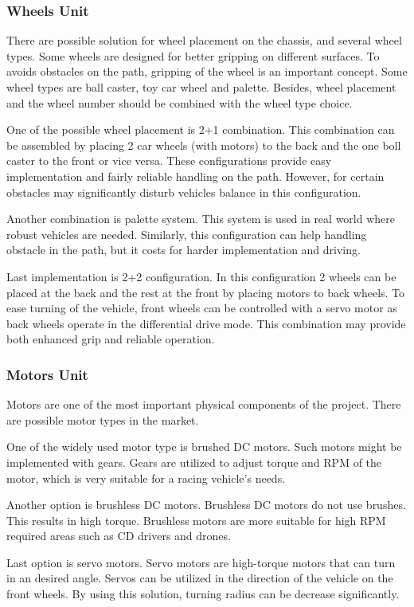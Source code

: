 \documentclass[a4paper,12pt]{article}
\begin{document}
\subsubsection{Wheels Unit}
There are possible solution for wheel placement on the chassis, and several wheel types. Some wheels are designed for better gripping on different surfaces. To avoids obstacles on the path, gripping of the wheel is an important concept. Some wheel types are ball caster, toy car wheel and palette. Besides, wheel placement and the wheel number should be combined with the wheel type choice. 

One of the possible wheel placement is 2+1 combination. This combination can be assembled by placing 2 car wheels (with motors) to the back and the one boll caster to the front or vice versa. These configurations provide easy implementation and fairly reliable handling on the path. However, for certain obstacles may significantly disturb vehicles balance in this configuration.

Another combination is palette system. This system is used in real world where robust vehicles are needed. Similarly, this configuration can help handling obstacle in the path, but it costs for harder implementation and driving.

Last implementation is 2+2 configuration. In this configuration 2 wheels can be placed at the back and the rest at the front by placing motors to back wheels. To ease turning of the vehicle, front wheels can be controlled with a servo motor as back wheels operate in the differential drive mode. This combination may provide both enhanced grip and reliable	 operation. 
\subsubsection{Motors Unit}
Motors are one of the most important physical components of the project. There are possible motor types in the market.

One of the widely used motor type is brushed DC motors. Such motors might be implemented with gears. Gears are utilized to adjust torque and RPM of the motor, which is very suitable for a racing vehicle's needs. 

Another option is brushless DC motors. Brushless DC motors do not use brushes. This results in high torque. Brushless motors are more suitable for high RPM required areas such as CD drivers and drones.

Last option is servo motors. Servo motors are high-torque motors that can turn in an desired angle. Servos can be utilized in the direction of the vehicle on the front wheels. By using this solution, turning radius can be decrease significantly.
\end{document}
